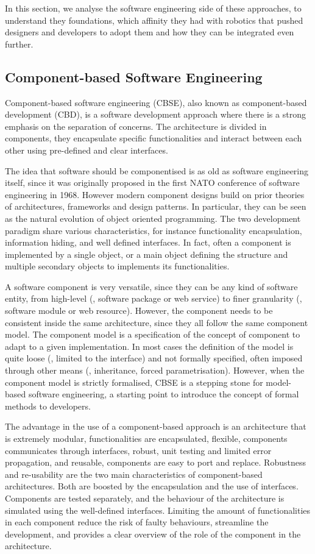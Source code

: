 In this section, we analyse the software engineering side of these approaches, to understand they foundations, which affinity they had with robotics that pushed designers and developers to adopt them and how they can be integrated even further.

\subsection{Component-based Software Engineering}
Component-based software engineering (CBSE), also known as component-based development (CBD), is a software development approach where there is a strong emphasis on the separation of concerns. The architecture is divided in components, they encapsulate specific functionalities and interact between each other using pre-defined and clear interfaces.

The idea that software should be componentised is as old as software engineering itself, since it was originally proposed in the first NATO conference of software engineering in 1968. However modern component designs build on prior theories of architectures, frameworks and design patterns. In particular, they can be seen as the natural evolution of object oriented programming. The two development paradigm share various characteristics, for instance functionality encapsulation, information hiding, and well defined interfaces. In fact, often a component is implemented by a single object, or a main object defining the structure and multiple secondary objects to implements its functionalities.

A software component is very versatile, since they can be any kind of software entity, from high-level (\eg, software package or web service) to finer granularity (\eg, software module or web resource). However, the component needs to be consistent inside the same architecture, since they all follow the same component model. The component model is a specification of the concept of component to adapt to a given implementation. In most cases the definition of the model is quite loose (\eg, limited to the interface) and not formally specified, often imposed through other means (\eg, inheritance, forced parametrisation). However, when the component model is strictly formalised, CBSE is a stepping stone for model-based software engineering, a starting point to introduce the concept of formal methods to developers.

The advantage in the use of a component-based approach is an architecture that is extremely modular, functionalities are encapsulated, flexible, components communicates through interfaces, robust, unit testing and limited error propagation, and reusable, components are easy to port and replace. Robustness and re-usability are the two main characteristics of component-based architectures. Both are boosted by the encapsulation and the use of interfaces. Components are tested separately, and the behaviour of the architecture is simulated using the well-defined interfaces. Limiting the amount of functionalities in each component reduce the risk of faulty behaviours, streamline the development, and provides a clear overview of the role of the component in the architecture.

